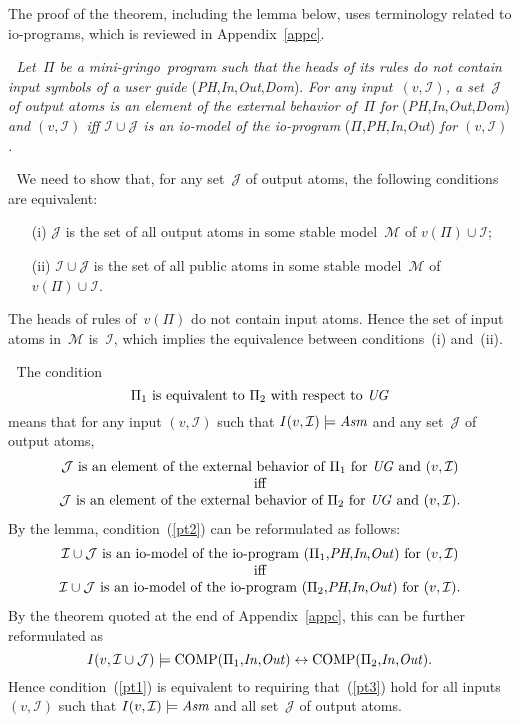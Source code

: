 \documentclass{new_tlp}
\def\lrar{\leftrightarrow}
\def\beq{\begin{equation}}
\def\eeq#1{\label{#1}\end{equation}}
\def\ba{\begin{array}}
\def\ea{\end{array}}
\def\gringo{{\sc gringo}}
\newcommand{\I}{\mathcal{I}}
\newcommand{\J}{\mathcal{J}}
\newcommand{\M}{\mathcal{M}}
\begin{document}
The proof of the theorem, including the lemma below, uses
terminology related to io-programs, which
is reviewed in Appendix~\ref{appc}.

\medskip{}$\;$\emph{
Let~$\Pi$ be a mini-\gringo\ program such that the heads of its rules do not
contain input symbols of a user guide}
(\emph{PH},\emph{In},\emph{Out},\emph{Dom\/}). \emph{For any
  input~$(v,\I)$, a set~$\J$ of
  output atoms is an element of the external behavior
  of~$\Pi$ for} (\emph{PH},\emph{In},\emph{Out},\emph{Dom\/})
\emph{and $(v,\I)$ iff
$\I\cup\J$ is an io-model of the io-program}
($\Pi$,\emph{PH},\emph{In},\emph{Out}) \emph{for $(v,\I)$.}

\medskip{}$\;$
We need to show that, for any set~$\J$ of output atoms, the following
conditions are equivalent:
\begin{itemize}
\item[(i)] $\J$ is the set of all output atoms in some stable model~$\M$ 
  of $v(\Pi)\cup\I$;
\item[(ii)] $\I\cup\J$ is the set of all public atoms in some stable
  model~$\M$ of $v(\Pi)\cup\I$.
\end{itemize}
The heads of rules of~$v(\Pi)$ do not contain input atoms.  Hence
the set of input atoms in~$\M$ is~$\I$, which implies the equivalence
between conditions~(i) and~(ii).

\medskip{}$\;$
The condition
\beq
\Pi_1\hbox{ is equivalent to }\Pi_2\hbox{ with respect to }\emph{UG}
\eeq{pt1}
means that for any input $(v,\I)$ such that $I(v,\I)\models\emph{Asm}$
and any set~$\J$ of output atoms,
\beq\ba c
\J\hbox{ is an element of the external behavior
  of~$\Pi_1$ for \emph{UG} and }(v,\I)\\
\hbox{iff}\\
\J\hbox{ is an element of the external behavior
  of~$\Pi_2$ for \emph{UG} and }(v,\I).
\ea\eeq{pt2}
By the lemma, condition~(\ref{pt2}) can be reformulated as follows:
$$\ba c
\I\cup\J\hbox{ is an io-model of the io-program
($\Pi_1$,\emph{PH},\emph{In},\emph{Out}) for }(v,\I)\\
\hbox{iff}\\
\I\cup\J\hbox{ is an io-model of the io-program
($\Pi_2$,\emph{PH},\emph{In},\emph{Out}) for }(v,\I).\\
\ea$$
By the theorem quoted at the end of Appendix~\ref{appc}, this can be further
reformulated as
\beq I(v,\I\cup\J) \models
\hbox{COMP($\Pi_1$,\emph{In\/},\emph{Out\/})}
\lrar
\hbox{COMP($\Pi_2$,\emph{In\/},\emph{Out\/})}.
\eeq{pt3}
Hence condition~(\ref{pt1}) is equivalent to requiring that~(\ref{pt3})
hold for all inputs $(v,\I)$ such that
$I(v,\I)\models\emph{Asm}$ and all set~$\J$ of output atoms.
\end{document}
